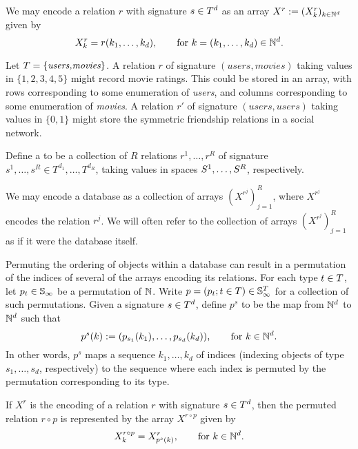 We may encode a relation $r$ with signature $s \in T^d$ as an array $X^r := (X^r_{k})_{k \in \mathbb{N}^d}$ given by
\[
X^r_{k} = r(k_1,\dotsc,k_d), \qquad \text{for } k = (k_1,\dotsc, k_d) \in \mathbb{N}^d.
\]

\begin{example} 
Let $T = \{\textit{users,movies}\}$.
A relation $r$ of signature $(\textit{users},\textit{movies})$ taking values in $\{1,2,3,4,5\}$ might record movie ratings.
This could be stored in an array, with rows corresponding to some enumeration of \textit{users}, and columns corresponding to some enumeration of \textit{movies}. 
A relation $r'$ of signature $(\textit{users},\textit{users})$ taking values in $\{0,1\}$ might store the symmetric friendship relations in a social network.
\end{example}

\begin{definition}[database]
Define a  to be a collection of $R$ relations $r^1,\dotsc,r^R$ of signature $s^1,\dotsc,s^R \in T^{d_1},\dotsc,T^{d_R}$, taking values in spaces $S^1,\dotsc,S^R$, respectively.
\end{definition}

We may encode a database as a collection of arrays $(X^{r^j})_{j=1}^R$, where $X^{r^j}$ encodes the relation $r^j$.  
We will often refer to the collection of arrays $(X^{r^j})_{j=1}^R$ as if it were the database itself.

Permuting the ordering of objects within a database can result in a permutation of the indices of several of the arrays encoding its relations.
For each type $t \in T$, let $p_t \in \mathbb{S}_{\infty}$ be a permutation of $\mathbb{N}$. 
Write $p = (p_t ; t \in T) \in \mathbb{S}_{\infty}^T$ for a collection of such permutations.
Given a signature $s \in T^{d}$, define $p^s$ to be the map from $\mathbb{N}^{d}$ to $\mathbb{N}^{d}$ such that
\[
p^s(k) := (p_{s_1}(k_1), \dotsc,p_{s_{d}}(k_{d})), \qquad \text{for } k \in \mathbb{N}^{d}.
\]
In other words, $p^s$ maps a sequence $k_1,\dotsc,k_d$ of indices (indexing objects of type $s_1,\dotsc,s_d$, respectively) to the sequence where each index is permuted by the permutation corresponding to its type.

If $X^r$ is the encoding of a relation $r$ with signature $s \in T^d$, then the permuted relation $r \circ p$ is represented by the array $X^{r\circ p}$ given by
\[
X^{r \circ p}_{k} = X^r_{p^s(k)}, \qquad \text{for } k \in \mathbb{N}^d. \label{eq:arrays:arrayperm}
\]

